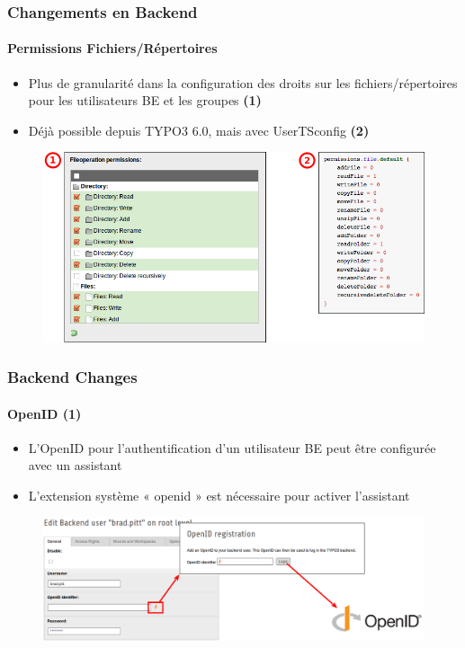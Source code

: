 
\begin{frame}[fragile]
	\frametitle{Changements en Backend}
	\framesubtitle{Permissions Fichiers/Répertoires}

 	\begin{itemize}
		\item Plus de granularité dans la configuration des droits sur les fichiers/répertoires pour les utilisateurs BE et les groupes
			\begingroup\color{typo3red}\textbf{(1)}\endgroup
		\item Déjà possible depuis TYPO3 6.0, mais avec UserTSconfig
			\begingroup\color{typo3red}\textbf{(2)}\endgroup
	\end{itemize}

	\begin{figure}
		\includegraphics[width=0.75\linewidth]{Images/BackendChanges/FileAndDirectoryPermissions.png}
	\end{figure}

\end{frame}


\begin{frame}[fragile]
	\frametitle{Backend Changes}
	\framesubtitle{OpenID (1)}

 	\begin{itemize}
		\item L'OpenID pour l'authentification d'un utilisateur BE peut être configurée avec un assistant
		\item L'extension système « openid » est nécessaire pour activer l'assistant
	\end{itemize}

	\begin{figure}
		\includegraphics[width=0.95\linewidth]{Images/BackendChanges/OpenIdWizard.png}
	\end{figure}

\end{frame}

